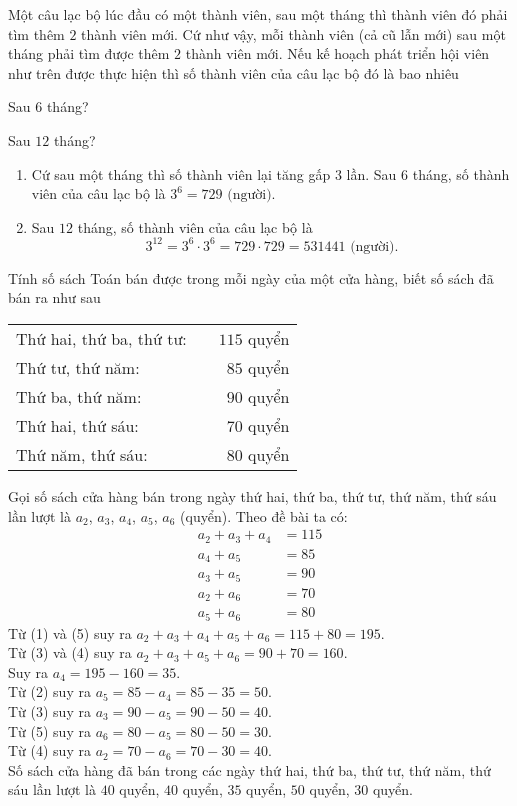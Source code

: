 \begin{vd}
	Một câu lạc bộ lúc đầu có một thành viên, sau một tháng thì thành viên đó phải tìm thêm $2$ thành viên mới. Cứ như vậy, mỗi thành viên (cả cũ lẫn mới) sau một tháng phải tìm được thêm $2$ thành viên mới. Nếu kế hoạch phát triển hội viên như trên được thực hiện thì số thành viên của câu lạc bộ đó là bao nhiêu
	\begin{listEX}[2]
		\item Sau $6$ tháng?
		\item Sau $12$ tháng?
	\end{listEX}
	\loigiai
	{
		\begin{enumerate}
			\item Cứ sau một tháng thì số thành viên lại tăng gấp $3$ lần. Sau $6$ tháng, số thành viên của câu lạc bộ là $3^6 = 729 \text{ (người).}$
			\item Sau $12$ tháng, số thành viên của câu lạc bộ là 
			\[3^12 = 3^6 \cdot 3^6 = 729 \cdot 729 = 531441 \text{ (người).}\]
		\end{enumerate}
	}
\end{vd}

\begin{vd}
	Tính số sách Toán bán được trong mỗi ngày của một cửa hàng, biết số sách đã bán ra như sau
	\begin{center}
		\begin{tabular}{lcr}
			Thứ hai, thứ ba, thứ tư: && $115$ quyển\\
			Thứ tư, thứ năm: && $85$ quyển\\
			Thứ ba, thứ năm: && $90$ quyển\\
			Thứ hai, thứ sáu: && $70$ quyển\\
			Thứ năm, thứ sáu: && $80$ quyển
		\end{tabular}
	\end{center}
	\loigiai
	{
		Gọi số sách cửa hàng bán trong ngày thứ hai, thứ ba, thứ tư, thứ năm, thứ sáu lần lượt là $a_2$, $a_3$, $a_4$, $a_5$, $a_6$ (quyển). Theo đề bài ta có:
		\begin{align}
			a_2+a_3+a_4 &= 115 \tag{1}\\
			a_4+a_5 &= 85 \tag{2}\\
			a_3+a_5 &= 90 \tag{3}\\
			a_2+a_6 &= 70 \tag{4}\\
			a_5 + a_6 &= 80 \tag{5}
		\end{align}
		Từ (1) và (5) suy ra $a_2+a_3+a_4+a_5+a_6 = 115+80 = 195$.\\
		Từ (3) và (4) suy ra $a_2+a_3+a_5+a_6 = 90+70 = 160$.\\
		Suy ra $a_4 = 195 - 160 = 35$.\\
		Từ (2) suy ra $a_5 = 85 - a_4 = 85 - 35 = 50$.\\
		Từ (3) suy ra $a_3 = 90-a_5 = 90-50=40$.\\
		Từ (5) suy ra $a_6 = 80-a_5 = 80-50 = 30$.\\
		Từ (4) suy ra $a_2 = 70 - a_6 = 70 - 30 = 40$.\\
		Số sách cửa hàng đã bán trong các ngày thứ hai, thứ ba, thứ tư, thứ năm, thứ sáu lần lượt là $40$ quyển, $40$ quyển, $35$ quyển, $50$ quyển, $30$ quyển.
	}
\end{vd}

